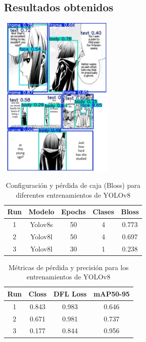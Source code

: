 \documentclass[conference]{IEEEtran}
\begin{document}
\subsection{Resultados obtenidos}\label{resultados-obtenidos}
\includegraphics[width=2.20231in,height=3.158in]{resources/Picture1.jpg}


\begin{table}[h!]
\centering
\small
\begin{tabular}{|c|c|c|c|c|}
\hline
\textbf{Run} & \textbf{Modelo} & \textbf{Epochs} & \textbf{Clases} & \textbf{Bloss} \\
\hline
1 & Yolov8s & 50 & 4 & 0.773 \\
2 & Yolov8l & 50 & 4 & 0.697 \\
3 & Yolov8l & 30 & 1 & 0.238 \\
\hline
\end{tabular}
\caption{Configuración y pérdida de caja (Bloss) para diferentes entrenamientos de YOLOv8}
\label{tab:yolov8-config}
\end{table}

\begin{table}[h!]
\centering
\small
\begin{tabular}{|c|c|c|c|}
\hline
\textbf{Run} & \textbf{Closs} & \textbf{DFL Loss} & \textbf{mAP50-95} \\
\hline
1 & 0.843 & 0.983 & 0.646 \\
2 & 0.671 & 0.981 & 0.737 \\
3 & 0.177 & 0.844 & 0.956 \\
\hline
\end{tabular}
\caption{Métricas de pérdida y precisión para los entrenamientos de YOLOv8}
\label{tab:yolov8-metrics}
\end{table}
\end{document}
